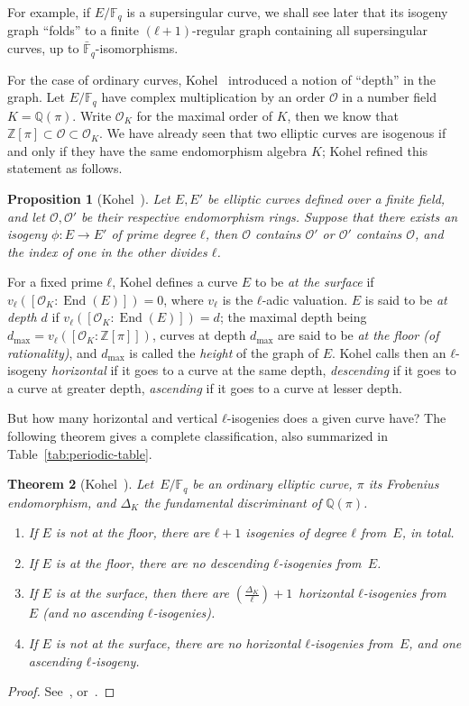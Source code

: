 \documentclass[10pt]{article}
\theoremstyle{plain}
\newtheorem{theorem}{Theorem}
\newtheorem{proposition}[theorem]{Proposition}
\theoremstyle{definition}
\DeclareMathOperator{\End}{End} %
\def\F{\ensuremath{\mathbb{F}}}
\def\O{\ensuremath{\mathcal{O}}}
\begin{document}
\begin{prposition}
For example, if $E/\F_q$ is a supersingular curve, we shall see later
that its isogeny graph ``folds'' to a finite $(ℓ+1)$-regular graph
containing all supersingular curves, up to $\bar{\F}_q$-isomorphisms.

For the case of ordinary curves, Kohel~\cite{kohel} introduced a
notion of ``depth'' in the graph. %
Let $E/\F_q$ have complex multiplication by an order $\O$ in a number
field $K=ℚ(π)$. %
Write $\O_K$ for the maximal order of $K$, then we know that
$ℤ[π] ⊂ \O ⊂ \O_K$. %
We have already seen that two elliptic curves are isogenous if and
only if they have the same endomorphism algebra $K$; Kohel refined
this statement as follows.

\begin{proposition}[{Kohel~\cite[Prop.~21]{kohel}}]
  Let $E,E'$ be elliptic curves defined over a finite field, and let
  $\O,\O'$ be their respective endomorphism rings. %
  Suppose that there exists an isogeny $ϕ:E→E'$ of prime degree $ℓ$,
  then $\O$ contains $\O'$ or $\O'$ contains $\O$, and the index of
  one in the other divides $ℓ$.
\end{proposition}

For a fixed prime $ℓ$, Kohel defines a curve $E$ to be \emph{at the
  surface} if $v_ℓ([\O_K:\End(E)])=0$, where $v_ℓ$ is the $ℓ$-adic
valuation. %
$E$ is said to be \emph{at depth $d$} if $v_ℓ([\O_K:\End(E)])=d$; the
maximal depth being $d_{\max}=v_ℓ([\O_K:ℤ[π]])$, curves at depth
$d_{\max}$ are said to be \emph{at the floor (of rationality)}, and
$d_{\max}$ is called the \emph{height} of the graph of $E$. %
Kohel calls then an $ℓ$-isogeny \emph{horizontal} if it goes to a
curve at the same depth, \emph{descending} if it goes to a curve at
greater depth, \emph{ascending} if it goes to a curve at lesser
depth. %

But how many horizontal and vertical $ℓ$-isogenies does a given curve
have?  %
The following theorem gives a complete classification, also summarized
in Table~\ref{tab:periodic-table}. %

\begin{theorem}[{Kohel~\cite{kohel}}]
  \label{prop:isogeny-count}
  Let~$E/\F_q$ be an ordinary elliptic curve, $π$ its Frobenius
  endomorphism, and $Δ_K$ the fundamental discriminant of $ℚ(π)$. %
  \begin{enumerate}
  \item If $E$ is not at the floor, there are $ℓ+1$ isogenies of
    degree $ℓ$ from~$E$, in total.
  \item If $E$ is at the floor, there are no descending $ℓ$-isogenies
    from~$E$.
  \item If $E$ is at the surface, then there are
    $\left(\frac{Δ_K}{ℓ}\right)+1$~horizontal $ℓ$-isogenies from~$E$
    (and no ascending $ℓ$-isogenies).
  \item If $E$ is not at the surface, there are no horizontal
    $ℓ$-isogenies from~$E$, and one ascending $ℓ$-isogeny.
  \end{enumerate}
\end{theorem}
\begin{proof}
  See~\cite[Prop.~21]{kohel}, or~\cite[Lecture~23]{sutherland-notes}.
\end{proof}


\end{prposition}
\end{document}
